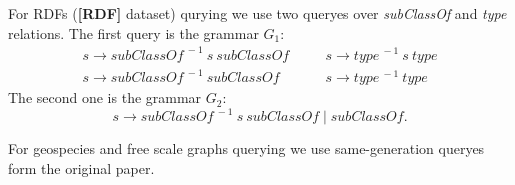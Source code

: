 For RDFs (\textbf{[RDF]} dataset) qurying we use two queryes over \textit{subClassOf} and \textit{type} relations.
The first query is the grammar $G_1$:
\[
 \begin{array}{lcl}
   s  \rightarrow \textit{subClassOf}^{\ -1} \ s \ \textit{subClassOf}   & \quad & s  \rightarrow \textit{type}^{\ -1} \ s \ \textit{type}     \\
   s  \rightarrow \textit{subClassOf}^{\ -1} \ \textit{subClassOf}       & \quad & s  \rightarrow  \textit{type}^{\ -1}  \ \textit{type}

 \end{array}
 \]
The second one is the grammar $G_2$: $$s \rightarrow \textit{subClassOf}^{\ -1} \ s \ \textit{subClassOf} \mid  \textit{subClassOf}.$$

For geospecies and free scale graphs querying we use same-generation queryes form the original paper.
